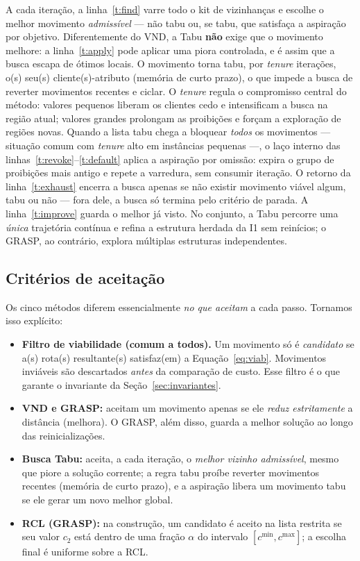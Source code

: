 \documentclass[12pt, a4paper]{article}
\begin{document}
 A cada iteração, a linha~\ref{t:find} varre todo o kit de vizinhanças e escolhe o melhor movimento \emph{admissível} --- não tabu ou, se tabu, que satisfaça a aspiração por objetivo. Diferentemente do VND, a Tabu \textbf{não} exige que o movimento melhore: a linha~\ref{t:apply} pode aplicar uma piora controlada, e é assim que a busca escapa de ótimos locais. O movimento torna tabu, por \textit{tenure} iterações, o(s) seu(s) cliente(s)-atributo (memória de curto prazo), o que impede a busca de reverter movimentos recentes e ciclar. O \textit{tenure} regula o compromisso central do método: valores pequenos liberam os clientes cedo e intensificam a busca na região atual; valores grandes prolongam as proibições e forçam a exploração de regiões novas. Quando a lista tabu chega a bloquear \emph{todos} os movimentos --- situação comum com \textit{tenure} alto em instâncias pequenas ---, o laço interno das linhas~\ref{t:revoke}--\ref{t:default} aplica a aspiração por omissão: expira o grupo de proibições mais antigo e repete a varredura, sem consumir iteração. O retorno da linha~\ref{t:exhaust} encerra a busca apenas se não existir movimento viável algum, tabu ou não --- fora dele, a busca só termina pelo critério de parada. A linha~\ref{t:improve} guarda o melhor já visto. No conjunto, a Tabu percorre uma \emph{única} trajetória contínua e refina a estrutura herdada da I1 sem reinícios; o GRASP, ao contrário, explora múltiplas estruturas independentes.

\subsection{Critérios de aceitação}\label{sec:aceitacao}
Os cinco métodos diferem essencialmente \emph{no que aceitam} a cada passo. Tornamos isso explícito:
\begin{itemize}[noitemsep]
\item \textbf{Filtro de viabilidade (comum a todos).} Um movimento só é \emph{candidato} se a(s) rota(s) resultante(s) satisfaz(em) a Equação~\eqref{eq:viab}. Movimentos inviáveis são descartados \emph{antes} da comparação de custo. Esse filtro é o que garante o invariante da Seção~\ref{sec:invariantes}.
\item \textbf{VND e GRASP:} aceitam um movimento apenas se ele \emph{reduz estritamente} a distância (melhora). O GRASP, além disso, guarda a melhor solução ao longo das reinicializações.
\item \textbf{Busca Tabu:} aceita, a cada iteração, o \emph{melhor vizinho admissível}, mesmo que piore a solução corrente; a regra tabu proíbe reverter movimentos recentes (memória de curto prazo), e a aspiração libera um movimento tabu se ele gerar um novo melhor global.
\item \textbf{RCL (GRASP):} na construção, um candidato é aceito na lista restrita se seu valor $c_2$ está dentro de uma fração $\alpha$ do intervalo $[c^{\min},c^{\max}]$; a escolha final é uniforme sobre a RCL.
\end{itemize}
\end{document}
